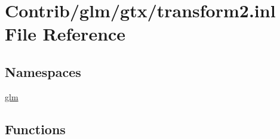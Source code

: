 \hypertarget{transform2_8inl}{}\section{Contrib/glm/gtx/transform2.inl File Reference}
\label{transform2_8inl}
\subsection*{Namespaces}
\begin{DoxyCompactItemize}
\item 
 \mbox{\hyperlink{namespaceglm}{glm}}
\end{DoxyCompactItemize}
\subsection*{Functions}
